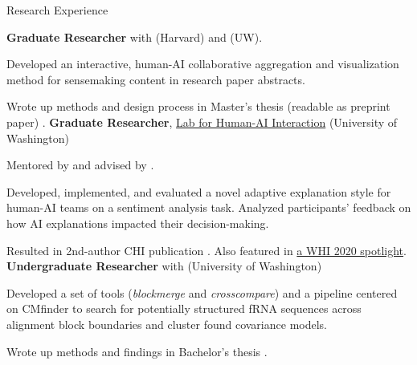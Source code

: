 \begin{rubric}{Research Experience}

\entry*[2020 -- 2021] %
	\textbf{Graduate Researcher} with \pGlassmanE{} (Harvard) and \pWeldD{} (UW).
	\par Developed an interactive, human-AI collaborative aggregation and visualization method for sensemaking content in research paper abstracts.
	\par Wrote up methods and design process in Master's thesis (readable as preprint paper) \cite{zhou2021thesis}.
\entry*[2019 -- 2021] %
	\textbf{Graduate Researcher}, \href{http://hai.cs.washington.edu}{Lab for Human-AI Interaction} (University of Washington)
	\par Mentored by \pBansalG{} and advised by \pWeldD{}.
	\par Developed, implemented, and evaluated a novel adaptive explanation style for human-AI teams on a sentiment analysis task. Analyzed participants' feedback on how AI explanations impacted their decision-making.
	\par Resulted in 2nd-author CHI publication \cite{bansal2021does}. Also featured in \href{https://sites.google.com/view/whi2020/home}{a WHI 2020 spotlight}.
\entry*[2018 -- 2019] %
    \textbf{Undergraduate Researcher} with \pRuzzoL{} (University of Washington)
    \par Developed a set of tools (\textit{blockmerge} and \textit{crosscompare}) and a pipeline centered on CMfinder to search for potentially structured fRNA sequences across alignment block boundaries and cluster found covariance models.
    \par Wrote up methods and findings in Bachelor's thesis \cite{zhou2019thesis}.
\end{rubric}